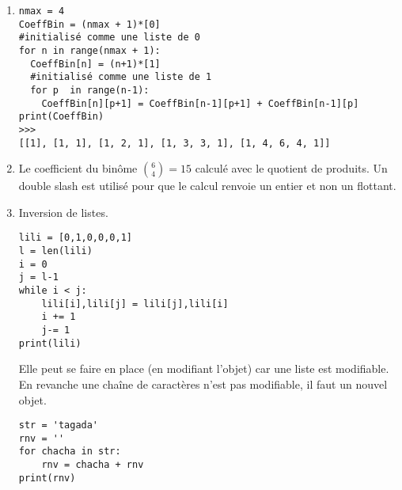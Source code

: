 \begin{enumerate}
  \item 
 
\begin{verbatim}
nmax = 4
CoeffBin = (nmax + 1)*[0]
#initialisé comme une liste de 0
for n in range(nmax + 1):
  CoeffBin[n] = (n+1)*[1]
  #initialisé comme une liste de 1
  for p  in range(n-1):
    CoeffBin[n][p+1] = CoeffBin[n-1][p+1] + CoeffBin[n-1][p]  
print(CoeffBin)
>>> 
[[1], [1, 1], [1, 2, 1], [1, 3, 3, 1], [1, 4, 6, 4, 1]]\end{verbatim}

  \item Le coefficient du binôme $\binom{6}{4}=15$ calculé avec le quotient de produits. Un double slash est utilisé pour que le calcul renvoie un entier et non un flottant.

  \item Inversion de listes.
\begin{verbatim}lili = [0,1,0,0,0,1]
l = len(lili)
i = 0
j = l-1
while i < j:
    lili[i],lili[j] = lili[j],lili[i]
    i += 1
    j-= 1
print(lili)\end{verbatim}
Elle peut se faire en place (en modifiant l'objet) car une liste est modifiable.\newline
En revanche une chaîne de caractères n'est pas modifiable, il faut un nouvel objet.
\begin{verbatim}str = 'tagada'
rnv = ''
for chacha in str:
    rnv = chacha + rnv
print(rnv)\end{verbatim}

\end{enumerate}
